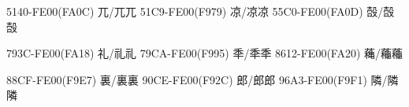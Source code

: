 5140-FE00(FA0C) 兀/兀︀兀 
51C9-FE00(F979) 凉/凉︀凉 
55C0-FE00(FA0D) 嗀/嗀︀嗀\par
793C-FE00(FA18) 礼/礼︀礼 
79CA-FE00(F995) 秊/秊︀秊 
8612-FE00(FA20) 蘒/蘒︀蘒\par
88CF-FE00(F9E7) 裏/裏︀裏 
90CE-FE00(F92C) 郎/郎︀郎 
96A3-FE00(F9F1) 隣/隣︀隣\par
